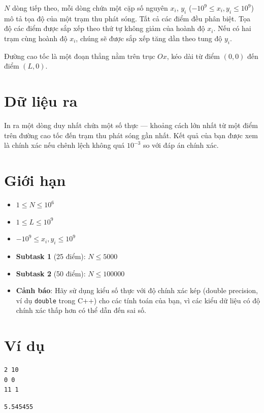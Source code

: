 \documentclass[12pt,a4paper]{article}
\begin{document}
$N$ dòng tiếp theo, mỗi dòng chứa một cặp số nguyên $x_i$, $y_i$ ($-10^9 \le x_i, y_i \le 10^9$) mô tả tọa độ của một trạm thu phát sóng. Tất cả các điểm đều phân biệt. Tọa độ các điểm được sắp xếp theo thứ tự không giảm của hoành độ $x_i$. Nếu có hai trạm cùng hoành độ $x_i$, chúng sẽ được sắp xếp tăng dần theo tung độ $y_i$.

Đường cao tốc là một đoạn thẳng nằm trên trục $Ox$, kéo dài từ điểm $(0, 0)$ đến điểm $(L, 0)$.

\section*{Dữ liệu ra}
In ra một dòng duy nhất chứa một số thực — khoảng cách lớn nhất từ một điểm trên đường cao tốc đến trạm thu phát sóng gần nhất. Kết quả của bạn được xem là chính xác nếu chênh lệch không quá $10^{-3}$ so với đáp án chính xác.

\section*{Giới hạn}
\begin{constraintbox}
\begin{itemize}
    \item $1 \le N \le 10^6$
    \item $1 \le L \le 10^9$
    \item $-10^9 \le x_i, y_i \le 10^9$
    \item \textbf{Subtask 1} (25 điểm): $N \le 5000$
    \item \textbf{Subtask 2} (50 điểm): $N \le 100000$
    \item \textbf{Cảnh báo}: Hãy sử dụng kiểu số thực với độ chính xác kép (double precision, ví dụ \texttt{double} trong C++) cho các tính toán của bạn, vì các kiểu dữ liệu có độ chính xác thấp hơn có thể dẫn đến sai số.
\end{itemize}
\end{constraintbox}

\section*{Ví dụ}
\begin{inputbox}
\begin{lstlisting}
2 10
0 0
11 1
\end{lstlisting}
\end{inputbox}

\begin{outputbox}
\begin{lstlisting}
5.545455
\end{lstlisting}
\end{outputbox}
\end{document}
